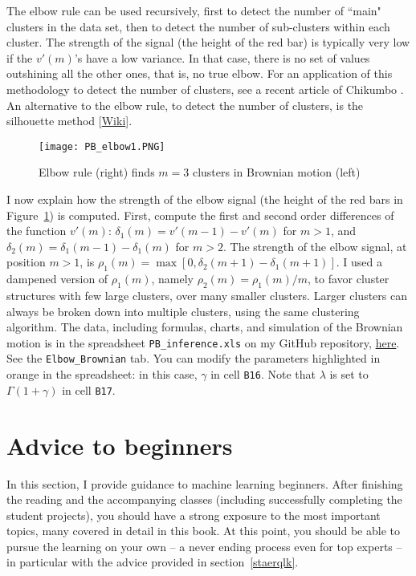 \documentclass[oneside,10pt]{book}
\begin{document}
The elbow rule can be used recursively, first to detect the number of ``main" clusters in the data set, then to detect the number of sub-clusters within each cluster. The strength of the signal (the height of the red bar) is typically very low if the $v'(m)$'s have a low variance. In that case, there is no set of values outshining all the other ones, that is, no true elbow. For an application of this methodology to detect the number of clusters, see a recent article of Chikumbo \cite{vg5}. An alternative to the elbow rule, to detect the number of clusters, 
is the silhouette method [\href{https://en.wikipedia.org/wiki/Silhouette_(clustering)}{Wiki}].

\begin{figure}[H]
\centering
\texttt{[image: PB\_elbow1.PNG]} 
\caption{Elbow rule (right) finds $m = 3$ clusters in Brownian motion (left)}
\label{fig:pbelbow1}
\end{figure}

I now explain how the strength of the elbow signal (the height of the red bars in Figure~\ref{fig:pbelbow1}) is computed. First, compute the first and second order differences of the function $v'(m)$: 
$\delta_1(m)=v'(m-1)-v'(m)$ for $m>1$, and $\delta_2(m)=\delta_1(m-1)-\delta_1(m)$ for $m>2$. The strength of the elbow signal, at position $m>1$, 
is  $\rho_1(m)=\max[0,\delta_2(m+1)-\delta_1(m+1)]$. I used a dampened version of $\rho_1(m)$, namely $\rho_2(m)=\rho_1(m)/m$, to favor cluster
structures with few large clusters, over many smaller clusters. Larger clusters can always be broken down into multiple clusters, using the same clustering algorithm. 
The data, including formulas, charts, and simulation of the Brownian motion is in the spreadsheet 
 \texttt{PB\_inference.xls} on my GitHub repository, \href{https://github.com/VincentGranville/Point-Processes/tree/main/Spreadsheets}{here}. See the \texttt{Elbow\_Brownian} tab.  You can modify the parameters highlighted in orange in the spreadsheet: in this case, $\gamma$ in cell 
\texttt{B16}. Note that
$\lambda$ is set to $\Gamma(1+\gamma)$ in cell \texttt{B17}. 

\section{Advice to beginners}

In this section, I provide guidance to machine learning beginners. After finishing the reading and the accompanying classes (including successfully completing the student projects), you should have a strong exposure to the most important topics, many covered in detail in this book. At this point, you should be able to pursue the learning on your own -- a never ending process even for top experts --  in particular with the advice provided in section~\ref{staerqlk}. 
\end{document}
